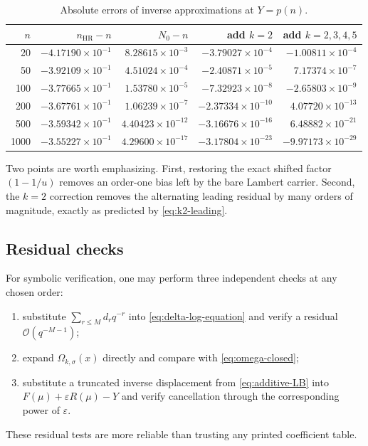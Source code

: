 \documentclass[11pt]{article}
\numberwithin{equation}{section}
\theoremstyle{mainthm}
\theoremstyle{defstyle}
\theoremstyle{remark}
\newcommand{\cO}{\mathcal O}
\begin{document}
\begin{table}[htbp]
\centering
\caption{Absolute errors of inverse approximations at \(Y=p(n)\).}
\label{tab:inverse-errors}
\begin{tabular}{r r r r r}
\toprule
\(n\) & \(n_{\mathrm{HR}}-n\) & \(N_0-n\) & add \(k=2\) & add \(k=2,3,4,5\) \\
\midrule
20   & \(-4.17190\times10^{-1}\) & \( 8.28615\times10^{-3}\) & \(-3.79027\times10^{-4}\) & \(-1.00811\times10^{-4}\) \\
50   & \(-3.92109\times10^{-1}\) & \( 4.51024\times10^{-4}\) & \(-2.40871\times10^{-5}\) & \( 7.17374\times10^{-7}\) \\
100  & \(-3.77665\times10^{-1}\) & \( 1.53780\times10^{-5}\) & \(-7.32923\times10^{-8}\) & \(-2.65803\times10^{-9}\) \\
200  & \(-3.67761\times10^{-1}\) & \( 1.06239\times10^{-7}\) & \(-2.37334\times10^{-10}\) & \( 4.07720\times10^{-13}\) \\
500  & \(-3.59342\times10^{-1}\) & \( 4.40423\times10^{-12}\) & \(-3.16676\times10^{-16}\) & \( 6.48882\times10^{-21}\) \\
1000 & \(-3.55227\times10^{-1}\) & \( 4.29600\times10^{-17}\) & \(-3.17804\times10^{-23}\) & \(-9.97173\times10^{-29}\) \\
\bottomrule
\end{tabular}
\end{table}

Two points are worth emphasizing.  First, restoring the exact shifted factor \((1-1/u)\) removes an order-one bias left by the bare Lambert carrier.  Second, the \(k=2\) correction removes the alternating leading residual by many orders of magnitude, exactly as predicted by \eqref{eq:k2-leading}.

\subsection{Residual checks}

For symbolic verification, one may perform three independent checks at any chosen order:
\begin{enumerate}
\item substitute \(\sum_{r\le M}d_rq^{-r}\) into \eqref{eq:delta-log-equation} and verify a residual \(\cO(q^{-M-1})\);
\item expand \(\Omega_{k,\sigma}(x)\) directly and compare with \eqref{eq:omega-closed};
\item substitute a truncated inverse displacement from \eqref{eq:additive-LB} into \(F(\mu)+\varepsilon R(\mu)-Y\) and verify cancellation through the corresponding power of \(\varepsilon\).
\end{enumerate}
These residual tests are more reliable than trusting any printed coefficient table.
\end{document}
